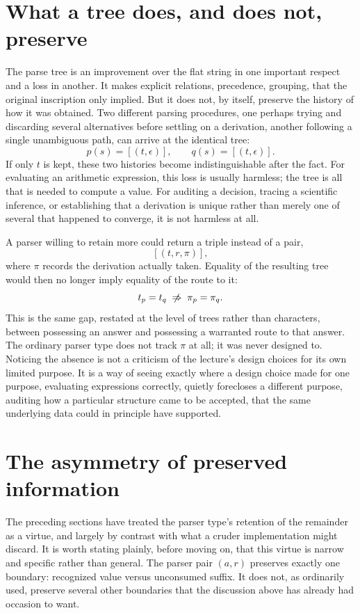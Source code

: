 \documentclass[11pt]{article}
\begin{document}
\section{What a tree does, and does not, preserve}

The parse tree is an improvement over the flat string in one important respect and a loss in another. It makes explicit relations, precedence, grouping, that the original inscription only implied. But it does not, by itself, preserve the history of how it was obtained. Two different parsing procedures, one perhaps trying and discarding several alternatives before settling on a derivation, another following a single unambiguous path, can arrive at the identical tree:
\[
p(s) = [(t, \epsilon)], \qquad q(s) = [(t, \epsilon)].
\]
If only $t$ is kept, these two histories become indistinguishable after the fact. For evaluating an arithmetic expression, this loss is usually harmless; the tree is all that is needed to compute a value. For auditing a decision, tracing a scientific inference, or establishing that a derivation is unique rather than merely one of several that happened to converge, it is not harmless at all.

A parser willing to retain more could return a triple instead of a pair,
\[
[(t, r, \pi)],
\]
where $\pi$ records the derivation actually taken. Equality of the resulting tree would then no longer imply equality of the route to it:
\[
t_p = t_q \;\centernot\Rightarrow\; \pi_p = \pi_q.
\]
This is the same gap, restated at the level of trees rather than characters, between possessing an answer and possessing a warranted route to that answer. The ordinary parser type does not track $\pi$ at all; it was never designed to. Noticing the absence is not a criticism of the lecture's design choices for its own limited purpose. It is a way of seeing exactly where a design choice made for one purpose, evaluating expressions correctly, quietly forecloses a different purpose, auditing how a particular structure came to be accepted, that the same underlying data could in principle have supported.

\section{The asymmetry of preserved information}

The preceding sections have treated the parser type's retention of the remainder as a virtue, and largely by contrast with what a cruder implementation might discard. It is worth stating plainly, before moving on, that this virtue is narrow and specific rather than general. The parser pair $(a, r)$ preserves exactly one boundary: recognized value versus unconsumed suffix. It does not, as ordinarily used, preserve several other boundaries that the discussion above has already had occasion to want.
\end{document}
